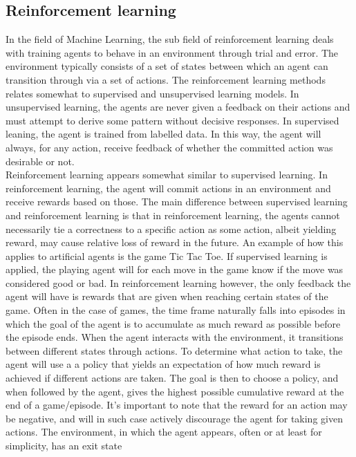 \subsection{Reinforcement learning \label{RL}}

In the field of Machine Learning, the sub field of reinforcement learning
deals with training agents to behave in an environment through
trial and error. The environment typically consists of a set of states
between which an agent can transition through via a set of actions.
The reinforcement learning methods relates somewhat 
to supervised and unsupervised learning models. In unsupervised 
learning, the agents are never given a feedback on their actions
and must attempt to derive some pattern without decisive responses.
In supervised leaning, the agent is trained from labelled data.
In this way, the agent will always, for any action, receive 
feedback of whether the committed action was desirable or not.\\
Reinforcement learning appears somewhat similar to supervised learning.
In reinforcement learning, the agent will commit actions in an environment
and receive rewards based on those. The main difference between supervised
learning and reinforcement learning is that in reinforcement learning,
the agents cannot necessarily tie a correctness 
to a specific action as some action, albeit yielding reward,
may cause relative loss of reward in the future. An example of how this applies 
to artificial agents is the game Tic Tac Toe. If supervised learning
is applied, the playing agent will for each move in the game know
if the move was considered good or bad. In reinforcement learning however,
the only feedback the agent will have is rewards that are given 
when reaching certain states of the game. 
Often in the case of games, the 
time frame naturally falls into episodes in which the 
goal of the agent is to accumulate as much reward as possible 
before the episode ends. When the agent interacts 
with the environment, it transitions between different states through 
actions. To determine what action to take, the agent will use
a a policy that yields an expectation of how much reward is achieved
if different actions are taken. 
The goal is then to choose a policy, and when followed by the agent,
gives the highest possible cumulative reward at the end of a game/episode. 
It's important to note that the reward 
for an action may be negative, and will in such case actively discourage 
the agent for taking given actions.
The environment, in which the agent appears, often 
or at least for simplicity, has an exit state
